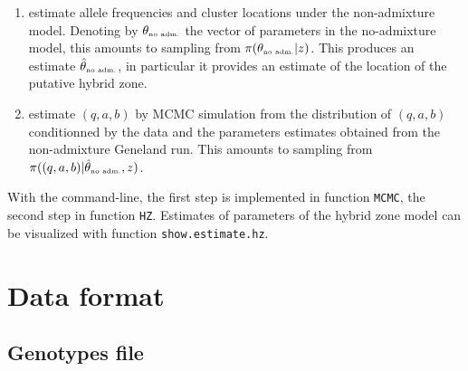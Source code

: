 \documentclass{article}
\begin{document}
\begin{enumerate}
\item estimate allele frequencies and cluster locations under the non-admixture model. Denoting by $\theta_{\mbox{\tiny no adm.}}$ the vector of 
parameters in the no-admixture model, this amounts to sampling from $\pi(\theta_{\mbox{\tiny no adm.}} |z)$. This produces 
an estimate $\hat{\theta}_{\mbox{\tiny no adm.}}$, in particular it provides an estimate of the location of the putative hybrid zone. 
\item estimate  $(q,a,b)$ by MCMC simulation from the distribution of  $(q,a,b)$ conditionned by the data and the parameters estimates obtained from the non-admixture Geneland run. This amounts to sampling from  $\pi( (q,a,b) | \hat{\theta}_{\mbox{\tiny no adm.}} , z)$.
\end{enumerate}

With the command-line, the first step is implemented in function {\tt MCMC}, the second step in function {\tt HZ}.
Estimates of parameters of the hybrid zone model can be visualized with function {\tt show.estimate.hz}.
\clearpage
\section{Data format}\label{sec:data_format}

\subsection{Genotypes file}
\end{document}
